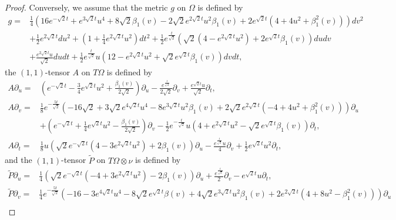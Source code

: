 \documentclass[reqno]{amsart}%
\theoremstyle{definition}
\numberwithin{equation}{section}
\begin{document}
\begin{proof}
Conversely, we assume that the metric $g$ on $\Omega$ is defined by
%
\begin{equation}\label{eqn:3.1ff3}
\begin{aligned}
g=&\tfrac{1}{4}(16 e^{-\sqrt{2}t}+e^{3 \sqrt{2}t}u^4+8\sqrt{2}\beta_1(v)
-2\sqrt{2}e^{2\sqrt{2}t}u^2\beta_1(v)+2e^{\sqrt{2}t}(4+4u^2+\beta_1^2(v)))dv^2\\
&+\tfrac{1}{2}e^{2\sqrt{2}t}du^2+(1+\tfrac{1}{4}e^{2\sqrt{2}t}u^2)dt^2+\tfrac{1}{2}e^{\tfrac{t}{\sqrt{2}}}
(\sqrt{2}(4-e^{2\sqrt{2}t}u^2)+2e^{\sqrt{2}t}\beta_1(v))dudv\\
&+\tfrac{e^{2\sqrt{2}t}u}{\sqrt{2}}dudt
+\tfrac{1}{2}e^{\tfrac{t}{\sqrt{2}}}u(12-e^{2\sqrt{2}t}u^2+\sqrt{2}e^{\sqrt{2}t}\beta_1(v))dvdt,
\end{aligned}
\end{equation}
the $(1,1)$-tensor $A$ on $T\Omega$ is defined by
\begin{equation}\label{eqn:3.1ff4}
\begin{aligned}
A\partial_u=&(e^{-\sqrt{2}t}-\tfrac{3}{4}e^{\sqrt{2}t}u^2+\tfrac{\beta_1(v)}{2\sqrt{2}})\partial_u
-\tfrac{e^{\tfrac{t}{\sqrt{2}}}}{2\sqrt{2}}\partial_v+\tfrac{e^{\sqrt{2}t}u}{\sqrt{2}}\partial_t,\\
A\partial_v=&\tfrac{1}{8}e^{-\tfrac{5t}{\sqrt{2}}}(-16\sqrt{2}+3\sqrt{2}e^{4\sqrt{2}t}u^4-8e^{3\sqrt{2}t} u^2\beta_1(v)+2\sqrt{2}e^{2\sqrt{2}t}(-4+4u^2+\beta_1^2(v)))\partial_u\\
&+(e^{-\sqrt{2}t}+\tfrac{1}{4}e^{\sqrt{2}t}u^2-\tfrac{\beta_1(v)}{2\sqrt{2}})\partial_v
-\tfrac{1}{2}e^{-\tfrac{t}{\sqrt{2}}}u(4+e^{2\sqrt{2}t}u^2-\sqrt{2}e^{\sqrt{2}t}\beta_1(v))\partial_t,\\
A\partial_t=&\tfrac{1}{8}u(\sqrt{2}e^{-\sqrt{2}t}(4-3e^{2\sqrt{2}t}u^2)+2\beta_1(v))\partial_u
-\tfrac{e^{\tfrac{t}{\sqrt{2}}}u}{4}\partial_v+\tfrac{1}{2}e^{\sqrt{2}t}u^2\partial_t,
\end{aligned}
\end{equation}
and the $(1,1)$-tensor $\tilde{P}$ on $T\Omega\otimes \nu$ is defined by
\begin{equation}\label{eqn:3.1ff5}
\begin{aligned}
\tilde{P}\partial_u=&\tfrac{1}{4}(\sqrt{2}e^{-\sqrt{2}t}(-4+3e^{2\sqrt{2}t}u^2)-2 \beta_1(v))\partial_u+\tfrac{e^{\tfrac{t}{\sqrt{2}}}}{2}\partial_v
-e^{\sqrt{2}t}u\partial_t,\\
\tilde{P}\partial_v=&\tfrac{1}{4}e^{-\tfrac{5t}{\sqrt{2}}}(-16-3e^{4\sqrt{2}t}u^4-8\sqrt{2}e^{\sqrt{2}t} \beta(v)+4\sqrt{2}e^{3\sqrt{2}t}u^2\beta_1(v)+2e^{2\sqrt{2}t}(4+8u^2-\beta_1^2(v)))\partial_u\\

\end{aligned}
\end{equation}
\end{proof}
\end{document}
